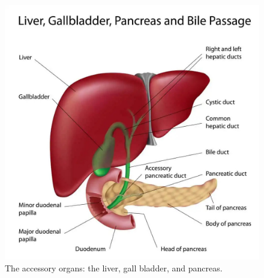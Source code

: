 \documentclass[12pt]{report}
\begin{document}
\begin{figure}[H]
\centering
    \includegraphics[width=\textwidth]{../figures/accessory organs.jpg}
    \caption{The accessory organs: the liver, gall bladder, and pancreas.}
    \label{fig:accessory-organs}
\end{figure}
\end{document}
